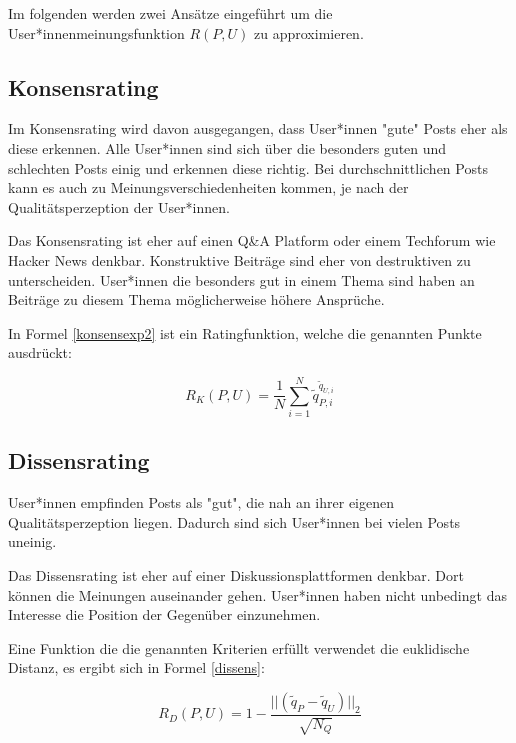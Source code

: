 Im folgenden werden zwei Ansätze eingeführt um die User*innenmeinungsfunktion $R(P,U)$ zu approximieren.
 
\subsection{Konsensrating}

Im Konsensrating wird davon ausgegangen, dass User*innen "gute" Posts eher als diese erkennen. Alle User*innen sind sich über die besonders guten und schlechten Posts einig und erkennen diese richtig. Bei durchschnittlichen Posts kann es auch zu Meinungsverschiedenheiten kommen, je nach der Qualitätsperzeption der User*innen.

Das Konsensrating ist eher auf einen Q\&A Platform oder einem Techforum wie Hacker News denkbar. Konstruktive Beiträge sind eher von destruktiven zu unterscheiden. User*innen die besonders gut in einem Thema sind haben an Beiträge zu diesem Thema möglicherweise höhere Ansprüche.

In Formel \ref{konsensexp2} ist ein Ratingfunktion, welche die genannten Punkte ausdrückt:

\begin{equation}
\label{konsensexp2}
R_K(P,U) = \frac{1}{N}\sum_{i = 1}^{N}\tilde{q}_{P,i}^{\tilde{q}_{U,i}}
\end{equation}



\subsection{Dissensrating}

User*innen empfinden Posts als "gut", die nah an ihrer eigenen Qualitätsperzeption liegen. Dadurch sind sich User*innen bei vielen Posts uneinig.

Das Dissensrating ist eher auf einer Diskussionsplattformen denkbar. Dort können die Meinungen auseinander gehen. User*innen haben nicht unbedingt das Interesse die Position der Gegenüber einzunehmen. 

Eine Funktion die die genannten Kriterien erfüllt verwendet die euklidische Distanz, es ergibt sich in Formel \ref{dissens}:


\begin{equation}
\label{dissens}
R_D(P,U) = 1 - \frac{||(\tilde{q}_P - \tilde{q}_U)||_2}{\sqrt{N_Q}}
\end{equation}



